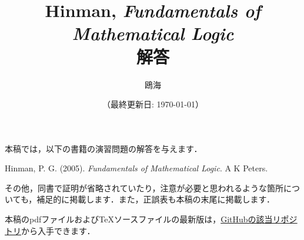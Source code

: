 \documentclass[xelatex, autodetect-engine, dvi=dvipdfmx, ja=standard, base=9pt, b5j, label-section=none, notitlepage, prefercjk]{bxjsreport}
\title{\gs Hinman, \emph{Fundamentals of Mathematical Logic} \\ 解答}
\author{鴎海}
\date{\small （最終更新日: \today）}
\begin{document}
\maketitle


本稿では，以下の書籍の演習問題の解答を与えます．

\begin{center}
  Hinman, P. G. (2005). \emph{Fundamentals of Mathematical Logic}. A K Peters.
\end{center}

その他，同書で証明が省略されていたり，注意が必要と思われるような箇所についても，補足的に掲載します．また，正誤表も本稿の末尾に掲載します．

本稿のpdfファイルおよび\TeX ソースファイルの最新版は，\href{https://github.com/kmi-ne/MathBook-Solutions/tree/main/Hinman_FoML}{GitHubの該当リポジトリ}から入手できます．

\tableofcontents

\clearpage

\setcounter{page}{1}

% 
% 
% 
% 

\renewcommand{\prechaptername}{}
\renewcommand{\postchaptername}{}




\end{document}
